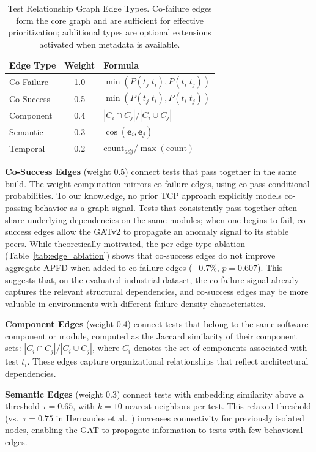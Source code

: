 \documentclass[10pt,journal,compsoc]{IEEEtran}
\begin{document}
\begin{table}[!t]
\centering
\caption{Test Relationship Graph Edge Types. Co-failure edges form the
core graph and are sufficient for effective prioritization; additional
types are optional extensions activated when metadata is available.}
\label{tab:edge_types}
\footnotesize
\begin{tabular}{lcl}
\toprule
\textbf{Edge Type} & \textbf{Weight} & \textbf{Formula} \\
\midrule
Co-Failure & 1.0 & $\min(P(t_j|t_i), P(t_i|t_j))$ \\
Co-Success & 0.5 & $\min(P(t_j|t_i), P(t_i|t_j))$ \\
Component & 0.4 & $|C_i \cap C_j| / |C_i \cup C_j|$ \\
Semantic & 0.3 & $\cos(\mathbf{e}_i, \mathbf{e}_j)$ \\
Temporal & 0.2 & $\text{count}_{adj} / \max(\text{count})$ \\
\bottomrule
\end{tabular}
\end{table}

\textbf{Co-Success Edges} (weight 0.5) connect tests that pass together in
the same build. The weight computation mirrors co-failure edges, using co-pass
conditional probabilities. To our knowledge, no prior TCP approach explicitly
models co-passing behavior as a graph signal. Tests that consistently pass
together often share underlying dependencies on the same modules; when one
begins to fail, co-success edges allow the GATv2 to propagate an anomaly
signal to its stable peers. While theoretically motivated, the per-edge-type
ablation (Table~\ref{tab:edge_ablation}) shows that co-success edges do not
improve aggregate APFD when added to co-failure edges ($-$0.7\%, $p = 0.607$).
This suggests that, on the evaluated industrial dataset, the co-failure signal
already captures the relevant structural dependencies, and co-success edges
may be more valuable in environments with different failure density
characteristics.

\textbf{Component Edges} (weight 0.4) connect tests that belong to the same
software component or module, computed as the Jaccard similarity of their
component sets: $|C_i \cap C_j| / |C_i \cup C_j|$, where $C_i$ denotes the
set of components associated with test $t_i$. These edges capture organizational
relationships that reflect architectural dependencies.

\textbf{Semantic Edges} (weight 0.3) connect tests with embedding similarity
above a threshold $\tau = 0.65$, with $k=10$ nearest neighbors per test. This
relaxed threshold (vs.\ $\tau = 0.75$ in Hernandes et al.~\cite{hernandes2025method})
increases connectivity for previously isolated nodes, enabling the GAT to
propagate information to tests with few behavioral edges.
\end{document}
